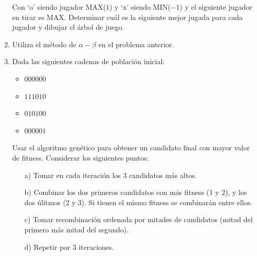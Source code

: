 \documentclass[12pt,letterpaper]{article}
\begin{document}
\begin{enumerate}[label=\arabic*.]
Con ‘o’ siendo jugador MAX($1$) y ‘x’ siendo MIN($-1$) y el siguiente jugador en tirar es MAX. Determinar cuál es la siguiente mejor jugada para cada jugador y dibujar el árbol de juego.

\item Utiliza el método de $\alpha - \beta$ en el problema anterior.

\item Dada las siguientes cadenas de población inicial:
  \begin{itemize}
  \item $000000$
  \item $111010$
  \item $010100$
  \item $000001$
  \end{itemize}
  
  Usar el algoritmo genético para obtener un candidato final con mayor valor de fitness. Considerar los siguientes puntos:
  
  \begin{enumerate}
  \item[a)] Tomar en cada iteración los $3$ candidatos más altos.
  \item[b)] Combinar los dos primeros candidatos con más fitness (1 y 2), y los dos úlitmos (2 y 3). Si tienen el mismo fitness se combinarán entre ellos.
  \item[c)] Tomar recombinación ordenada por mitades de candidatos (mitad del primero más mitad del segundo).
  \item[d)] Repetir por 3 iteraciones.
  \end{enumerate}
  
\end{enumerate}
\end{document}
